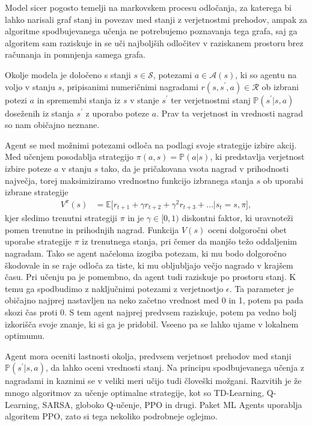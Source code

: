 Model sicer pogosto temelji na markovskem procesu odločanja, za katerega bi lahko narisali graf stanj in povezav med stanji z verjetnostmi prehodov, ampak za algoritme spodbujevanega učenja ne potrebujemo poznavanja tega grafa, saj ga algoritem sam raziskuje in se uči najboljših odločitev v raziskanem prostoru brez računanja in pomnjenja samega grafa.

Okolje modela je določeno s stanji $s \in \mathcal{S}$, potezami $a\in \mathcal{A}(s)$, ki so agentu na voljo v stanju $s$, pripisanimi numeričnimi nagradami $r(s, s^\prime, a) \in \mathcal{R}$ ob izbrani potezi $a$ in spremembi stanja iz $s$ v stanje $s^\prime$ ter verjetnostmi stanj $\mathbb{P}(s^\prime \vert s, a)$ doseženih iz stanja $s^\prime$ z uporabo poteze $a$. Prav ta verjetnost in vrednosti nagrad so nam običajno neznane.

Agent se med možnimi potezami odloča na podlagi svoje strategije izbire akcij. Med učenjem posodablja strategijo $\pi(a, s)=\mathbb{P}(a\vert s)$, ki predstavlja verjetnost izbire poteze $a$ v stanju $s$ tako, da je pričakovana vsota nagrad v prihodnosti največja, torej maksimiziramo vrednostno funkcijo izbranega stanja $s$ ob uporabi izbrane strategije
\begin{align}
V^\pi(s) &= \mathbb{E}\lbrack r_{t+1} + \gamma r_{t+2} + \gamma^2r_{t+3} + \ldots\vert s_t=s, \pi\rbrack, \label{eq:value}
\end{align}
kjer sledimo trenutni strategiji $\pi$ in je $\gamma\in\lbrack 0, 1)$ diskontni faktor, ki uravnoteži pomen trenutne in prihodnjih nagrad. Funkcija $V(s)$ oceni dolgoročni obet uporabe strategije $\pi$ iz trenutnega stanja, pri čemer da manjšo težo oddaljenim nagradam. Tako se agent načeloma izogiba potezam, ki mu bodo dolgoročno škodovale in se raje odloča za tiste, ki mu obljubljajo večjo nagrado v krajšem času. Pri učenju pa je pomembno, da agent tudi raziskuje po prostoru stanj. K temu ga spodbudimo z naključnimi potezami z verjetnostjo $\epsilon$. Ta parameter je običajno najprej nastavljen na neko začetno vrednost med 0 in 1, potem pa pada skozi čas proti 0. S tem agent najprej predvsem raziskuje, potem pa vedno bolj izkorišča svoje znanje, ki si ga je pridobil. Vseeno pa se lahko ujame v lokalnem optimumu.

Agent mora oceniti lastnosti okolja, predvsem verjetnost prehodov med stanji $\mathbb{P}(s^\prime\vert s, a)$, da lahko oceni vrednosti stanj. Na principu spodbujevanega učenja z nagradami in kaznimi se v veliki meri učijo tudi človeški možgani. Razvitih je že mnogo algoritmov za učenje optimalne strategije, kot so TD-Learning, Q-Learning, SARSA, globoko Q-učenje, PPO in drugi. Paket ML Agents uporablja algoritem PPO, zato si tega nekoliko podrobneje oglejmo.

